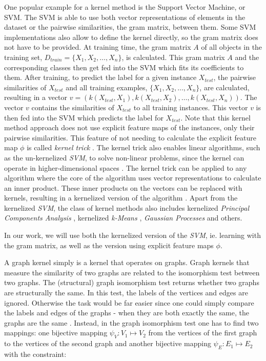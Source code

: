 One popular example for a kernel method is the Support Vector Machine, or SVM.
The SVM is able to use both vector representations of elements in the dataset or the pairwise similarities, the gram matrix, between them.
Some SVM implementations also allow to define the kernel directly, so the gram matrix does not have to be provided.
At training time, the gram matrix $A$ of all objects in the training set, $D_{train} = \{X_1, X_2, \ldots, X_n\}$, is calculated.
This gram matrix $A$ and the corresponding classes then get fed into the SVM which fits its coefficients to them.
After training, to predict the label for a given instance $X_{test}$, the pairwise similarities of $X_{test}$ and all training examples, $\{X_1, X_2, \ldots, X_n\}$, are calculated, resulting in a vector $v = (k(X_{test}, X_1), k(X_{test}, X_2), \ldots, k(X_{test}, X_n))$.
The vector $v$ contains the similarities of $X_{test}$ to all training instances.
This vector $v$ is then fed into the SVM which predicts the label for $X_{test}$.
Note that this kernel method approach does not use explicit feature maps of the instances, only their pairwise similarities.
This feature of not needing to calculate the explicit feature map $\phi$ is called \textit{kernel trick} \cite[p.~292]{Bishop2006}.
The kernel trick also enables linear algorithms, such as the un-kernelized \textit{SVM}, to solve non-linear problems, since the kernel can operate in higher-dimensional spaces	.
The kernel trick can be applied to any algorithm where the core of the algorithm uses vector representations to calculate an inner product. These inner products on the vectors can be replaced with kernels, resulting in a kernelized version of the algorithm \cite{Wu}.
Apart from the kernelized \textit{SVM}, the class of kernel methods also includes kernelized \textit{Principal Components Analysis} \cite{Scholkopf1998}, kernelized \textit{k-Means} \cite{Jain2010}, \textit{Gaussian Processes} \cite[p.~303]{Bishop2006} and others.

In our work, we will use both the kernelized version of the \textit{SVM}, ie. learning with the gram matrix, as well as the version using explicit feature maps $\phi$.

A graph kernel simply is a kernel that operates on graphs.
Graph kernels that measure the similarity of two graphs are related to the isomorphism test \cite[p.~4]{Bondy1976} between two graphs.
The (structural) graph isomorphism test returns whether two graphs are structurally the same.
In this test, the labels of the vertices and edges are ignored. Otherwise the task would be far easier since one could simply compare the labels and edges of the graphs - when they are both exactly the same, the graphs are the same \cite[p.~4]{Bondy1976}.
Instead, in the graph isomorphism test one has to find two mappings: one bijective mapping $\psi_{V}: V_1 \mapsto V_2$ from the vertices of the first graph to the vertices of the second graph and another bijective mapping $\psi_{E}: E_1 \mapsto E_2$ with the constraint:

